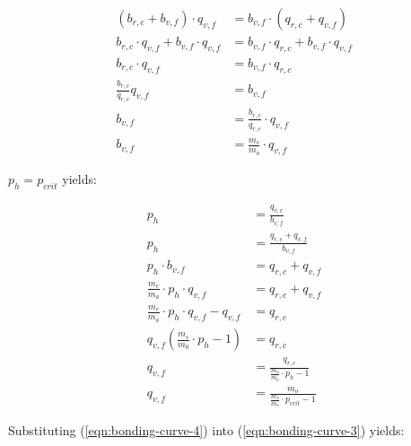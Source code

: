 \documentclass[table, twocolumn]{article}
\begin{document}
\begin{align} \label{eqn:bonding-curve-3}
  (b_{r, c} + b_{v, f}) \cdot q_{v, f}              & =
  b_{v, f} \cdot (q_{r, c} + q_{v, f}) \nonumber                                                           \\
  b_{r, c} \cdot q_{v, f} + b_{v, f} \cdot q_{v, f} & =
  b_{v, f} \cdot q_{r, c} + b_{v, f} \cdot q_{v, f} \nonumber                                              \\
  b_{r, c} \cdot q_{v, f}                           & = b_{v, f} \cdot q_{r, c} \nonumber                  \\
  \frac{b_{r, c}}{q_{r, c}} q_{v, f}                & = b_{v, f} \nonumber                                 \\
  b_{v, f}                                          & = \frac{b_{r, c}}{q_{r, c}} \cdot q_{v, f} \nonumber \\
  b_{v, f}                                          & = \frac{m_s}{m_o} \cdot q_{v, f}
\end{align}

$p_h = p_{crit}$ yields:

\begin{align} \label{eqn:bonding-curve-4}
  p_h                                                 & = \frac{q_{v, c}}{b_{v, f}} \nonumber                      \\
  p_h                                                 & = \frac{q_{r, c} + q_{v, f}}{b_{v, f}} \nonumber           \\
  p_h \cdot b_{v, f}                                  & = q_{r, c} + q_{v, f} \nonumber                            \\
  \frac{m_e}{m_a} \cdot p_h \cdot q_{v, f}            & = q_{r, c} + q_{v, f} \nonumber                            \\
  \frac{m_e}{m_a} \cdot p_h \cdot q_{v, f} - q_{v, f} & = q_{r, c} \nonumber                                       \\
  q_{v, f} (\frac{m_s}{m_0} \cdot p_h - 1)            & = q_{r, c} \nonumber                                       \\
  q_{v, f}                                            & = \frac{q_{r, c}}{\frac{m_s}{m_o} \cdot p_h - 1} \nonumber \\
  q_{v, f}                                            & = \frac{m_o}{\frac{m_s}{m_o} \cdot p_{crit} - 1}
\end{align}

Substituting (\ref{eqn:bonding-curve-4}) into (\ref{eqn:bonding-curve-3}) yields:
\end{document}
